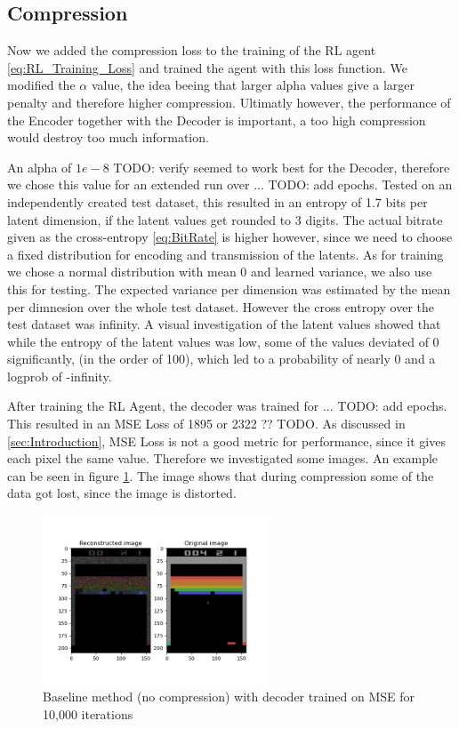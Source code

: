 \subsection{Compression}
Now we added the compression loss to the training of the RL agent
\ref{eq:RL_Training_Loss} and trained the agent with this loss function. We
modified the $\alpha$ value, the idea beeing that larger alpha values give a
larger penalty and therefore higher compression. Ultimatly however, the
performance of the Encoder together with the Decoder is important, a too high
compression would destroy too much information. %

An alpha of $1e-8$ TODO: verify seemed to work best for the Decoder, therefore
we chose this value for an extended run over ... TODO: add epochs. Tested on an
independently created test dataset, this resulted in an entropy of 1.7 bits per
latent dimension, if the latent values get rounded to 3 digits. The actual
bitrate given as the cross-entropy \ref{eq:BitRate} is higher however, since
we need to choose a fixed distribution for encoding and transmission of the
latents. As for training we chose a normal distribution with mean 0 and learned
variance, we also use this for testing. The expected variance per dimension was
estimated by the mean per dimnesion over the whole test dataset. However the
cross entropy over the test dataset was infinity. A visual investigation of the
latent values showed that while the entropy of the latent values was low, some
of the values deviated of 0 significantly, (in the order of 100), which led to a
probability of nearly 0 and a logprob of -infinity.

After training the RL Agent, the decoder was trained for ... TODO: add epochs.
This resulted in an MSE Loss of 1895 or 2322 ?? TODO. As discussed in
\ref{sec:Introduction}, MSE Loss is not a good metric for performance, since it
gives each pixel the same value. Therefore we investigated some images. An
example can be seen in figure \ref{fig:final_agent}. The image shows that during
compression some of the data got lost, since the image is distorted.
\begin{figure}[H]
    \centering
    \includegraphics[width=0.6\textwidth]{images/orig_reconstructed_final_agent.png}
    \caption{Baseline method (no compression) with decoder trained on MSE for 10,000 iterations}
    \label{fig:final_agent}
\end{figure}

